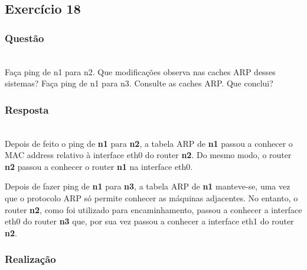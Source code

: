 \documentclass{llncs}
\begin{document}
\clearpage
\subsection{Exercício 18}
\subsubsection{Questão}\rule[-10pt]{0pt}{10pt}\\

Faça ping de n1 para n2. Que modificações observa nas caches ARP desses sistemas? Faça ping de n1 para n3. Consulte as caches ARP. Que conclui?

\subsubsection{Resposta}\rule[-10pt]{0pt}{10pt}\\

Depois de feito o ping de \textbf{n1} para \textbf{n2}, a tabela ARP de \textbf{n1} passou a conhecer o MAC address relativo à interface eth0 do router \textbf{n2}. Do mesmo modo, o router \textbf{n2} passou a conhecer o router \textbf{n1} na interface eth0.

Depois de fazer ping de \textbf{n1} para \textbf{n3}, a tabela ARP de \textbf{n1} manteve-se, uma vez que o protocolo ARP só permite conhecer as máquinas adjacentes. No entanto, o router \textbf{n2}, como foi utilizado para encaminhamento, passou a conhecer a interface eth0 do router \textbf{n3} que, por sua vez passou a conhecer a interface eth1 do router \textbf{n2}.

\subsubsection{Realização}\rule[-10pt]{0pt}{10pt}\\
\end{document}
